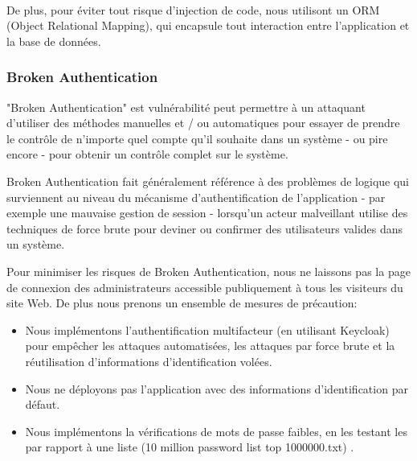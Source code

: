         \paragraph{}
        De plus, pour éviter tout risque d'injection de code, nous utilisont un ORM (Object 
        Relational Mapping), qui encapsule tout interaction entre l'application et la
        base de données.

    \subsubsection{Broken Authentication}
        "Broken Authentication" est vulnérabilité peut permettre à un attaquant d'utiliser 
        des méthodes manuelles et / ou automatiques pour essayer de prendre le contrôle de 
        n'importe quel compte qu'il souhaite dans un système - ou pire encore - pour obtenir 
        un contrôle complet sur le système.
        \par 
        Broken Authentication fait généralement référence à des problèmes de logique 
        qui surviennent au niveau du mécanisme d’authentification de l’application - par exemple une 
        mauvaise gestion de session - lorsqu'un 
        acteur malveillant utilise des techniques de force brute pour deviner ou confirmer des 
        utilisateurs valides dans un système.
        \par 
        Pour minimiser les risques de Broken Authentication, nous ne laissons pas la page de connexion 
        des administrateurs accessible publiquement à tous les visiteurs du site Web. De plus nous prenons 
        un ensemble de mesures de précaution:
        \begin{itemize}
            \item Nous implémentons l'authentification multifacteur (en utilisant Keycloak) pour empêcher 
            les attaques automatisées, les attaques par force brute et 
            la réutilisation d'informations d'identification volées.
            \item Nous ne déployons pas l'application avec des informations d'identification par défaut.
            \item Nous implémentons la vérifications de mots de passe faibles, en les testant les 
             par rapport à une liste (10 million password list top 1000000.txt) \cite{weakpass}.
        \end{itemize}
